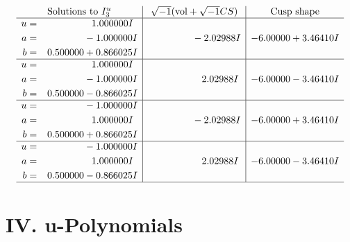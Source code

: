 \documentclass[1p]{elsarticle_modified}
\theoremstyle{definition}
\newcommand{\I}{\sqrt{-1}}
\begin{document}
$$\begin{array}{c|c|c}  
\text{Solutions to }I^u_{3}& \I (\text{vol} + \sqrt{-1}CS) & \text{Cusp shape}\\
 \hline 
\begin{aligned}
u &= \phantom{-0.000000 -}1.000000 I \\
a &= \phantom{-0.000000 } -1.000000 I \\
b &= \phantom{-}0.500000 + 0.866025 I\end{aligned}
 & \phantom{-0.000000 } -2.02988 I & -6.00000 + 3.46410 I \\ \hline\begin{aligned}
u &= \phantom{-0.000000 -}1.000000 I \\
a &= \phantom{-0.000000 } -1.000000 I \\
b &= \phantom{-}0.500000 - 0.866025 I\end{aligned}
 & \phantom{-0.000000 -}2.02988 I & -6.00000 - 3.46410 I \\ \hline\begin{aligned}
u &= \phantom{-0.000000 } -1.000000 I \\
a &= \phantom{-0.000000 -}1.000000 I \\
b &= \phantom{-}0.500000 + 0.866025 I\end{aligned}
 & \phantom{-0.000000 } -2.02988 I & -6.00000 + 3.46410 I \\ \hline\begin{aligned}
u &= \phantom{-0.000000 } -1.000000 I \\
a &= \phantom{-0.000000 -}1.000000 I \\
b &= \phantom{-}0.500000 - 0.866025 I\end{aligned}
 & \phantom{-0.000000 -}2.02988 I & -6.00000 - 3.46410 I\\
 \hline 
 \end{array}$$\newpage
\newpage\renewcommand{\arraystretch}{1}
\centering \section*{ IV. u-Polynomials}
\end{document}
